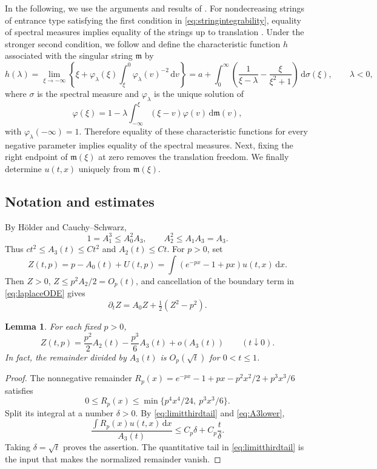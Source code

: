 \documentclass[11pt,letterpaper,reqno]{amsart}
\numberwithin{equation}{section}
\theoremstyle{plain}
\newtheorem{lemma}[theorem]{Lemma}
\theoremstyle{remark}
\newcommand{\dd}{\,\mathrm d}
\begin{document}
In the following, we use the arguments and results of \cite{Kotani}. For nondecreasing strings of entrance type satisfying the first condition in \eqref{eq:stringintegrability}, equality of spectral measures implies equality of the strings up to translation \cite[Theorem 1]{Kotani}. Under the stronger second condition, we follow \cite[Section~1]{Kotani} and define the characteristic function $h$ associated with the singular string $\mathfrak m$ by
\begin{equation}\label{eq:characteristic}
 h(\lambda)=\lim_{\xi\to-\infty}\left\{\xi+\varphi_\lambda(\xi)
 \int_\xi^0\varphi_\lambda(v)^{-2}\dd v\right\} = a + \int^{\infty}_0 \left( \frac{1}{\xi - \lambda} - \frac{\xi}{\xi^2 + 1} \right) \dd \sigma(\xi),\qquad\lambda<0,
\end{equation}
where $\sigma$ is the spectral measure and $\varphi_\lambda$ is the unique solution of 
\begin{equation} \label{eq:entrance_solution}
    \varphi(\xi) = 1 - \lambda \int^{\xi}_{-\infty} (\xi - v) \varphi(v) \dd \mathfrak{m}(v),
\end{equation}
with $\varphi_\lambda(-\infty)=1$. Therefore equality of these characteristic functions for every negative parameter implies equality of the spectral measures. Next, fixing the right endpoint of $\mathfrak{m}(\xi)$ at zero removes the translation freedom. We finally determine $u(t, x)$ uniquely from $\mathfrak{m}(\xi)$.

\subsection{Notation and estimates}
By H\"older and Cauchy--Schwarz,
\begin{equation}\label{eq:A3lower}
 1=A_1^3\le A_0^2A_3,\qquad A_2^2\le A_1A_3=A_3.
\end{equation}
Thus $ct^2\le A_3(t)\le Ct^2$ and $A_2(t)\le Ct$. For $p>0$, set
\[
 Z(t,p)=p-A_0(t)+U(t,p)=\int(e^{-px}-1+px)u(t,x)\dd x.
\]
Then $Z>0$, $Z\le p^2A_2/2=O_p(t)$, and cancellation of the boundary term in \eqref{eq:laplaceODE} gives
\begin{equation}\label{eq:ZODE}
 \partial_tZ=A_0Z+\tfrac12(Z^2-p^2).
\end{equation}

\begin{lemma}\label{lem:remainder}
For each fixed $p>0$,
\begin{equation*}
 Z(t,p)=\frac{p^2}{2}A_2(t)-\frac{p^3}{6}A_3(t)+o(A_3(t))\qquad(t\downarrow0).
\end{equation*}
In fact, the remainder divided by $A_3(t)$ is $O_p(\sqrt t)$ for $0<t\le1$.
\end{lemma}
\begin{proof}
The nonnegative remainder
$R_p(x)=e^{-px}-1+px-p^2x^2/2+p^3x^3/6$ satisfies
\[
 0\le R_p(x)\le \min\{p^4x^4/24,\ p^3x^3/6\}.
\]
Split its integral at a number $\delta>0$. By \eqref{eq:limitthirdtail} and \eqref{eq:A3lower},
\[
 \frac{\int R_p(x)u(t,x)\dd x}{A_3(t)}
 \le C_p\delta+C_p\frac{t}{\delta}.
\]
Taking $\delta=\sqrt t$ proves the assertion. The quantitative tail in \eqref{eq:limitthirdtail} is the input that makes the normalized remainder vanish.
\end{proof}
\end{document}
